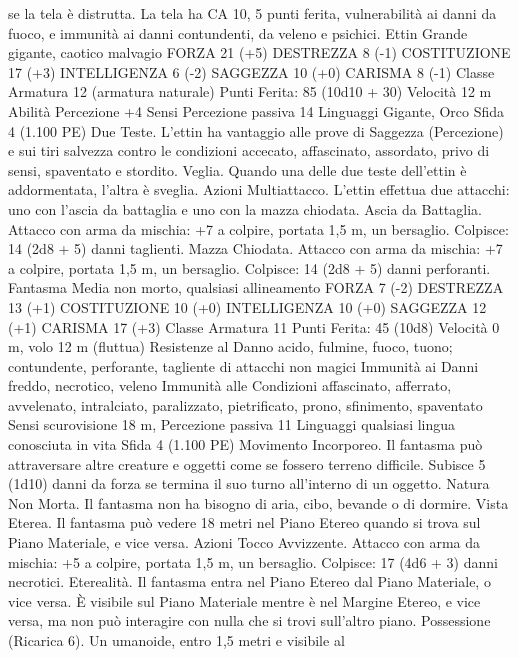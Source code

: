 \begin{multicols}{2}
se la tela è distrutta. La tela ha CA 10, 5 punti ferita,
vulnerabilità ai danni da fuoco, e immunità ai danni contundenti,
da veleno e psichici.
Ettin
Grande gigante, caotico malvagio
FORZA 21 (+5)
DESTREZZA 8 (-1)
COSTITUZIONE 17 (+3)
INTELLIGENZA 6 (-2)
SAGGEZZA 10 (+0)
CARISMA 8 (-1)
Classe Armatura 12 (armatura naturale)
\hspace*{0pt}\hfill{Punti Ferita}: 85 (10d10 + 30)
Velocità 12 m
Abilità Percezione +4
Sensi Percezione passiva 14
Linguaggi Gigante, Orco
Sfida 4 (1.100 PE)
Due Teste. L’ettin ha vantaggio alle prove di Saggezza
(Percezione) e sui tiri salvezza contro le condizioni accecato,
affascinato, assordato, privo di sensi, spaventato e stordito.
Veglia. Quando una delle due teste dell’ettin è addormentata,
l’altra è sveglia.
Azioni
Multiattacco. L’ettin effettua due attacchi: uno con l’ascia da
battaglia e uno con la mazza chiodata.
Ascia da Battaglia. Attacco con arma da mischia: +7 a colpire,
portata 1,5 m, un bersaglio.
Colpisce: 14 (2d8 + 5) danni taglienti.
Mazza Chiodata. Attacco con arma da mischia: +7 a colpire,
portata 1,5 m, un bersaglio.
Colpisce: 14 (2d8 + 5) danni perforanti.
Fantasma
Media non morto, qualsiasi allineamento
FORZA 7 (-2)
DESTREZZA 13 (+1)
COSTITUZIONE 10 (+0)
INTELLIGENZA 10 (+0)
SAGGEZZA 12 (+1)
CARISMA 17 (+3)
Classe Armatura 11
\hspace*{0pt}\hfill{Punti Ferita}: 45 (10d8)
Velocità 0 m, volo 12 m (fluttua)
Resistenze al Danno acido, fulmine, fuoco, tuono; contundente,
perforante, tagliente di attacchi non magici
Immunità ai Danni freddo, necrotico, veleno
Immunità alle Condizioni affascinato, afferrato, avvelenato,
intralciato, paralizzato, pietrificato, prono, sfinimento, spaventato
Sensi scurovisione 18 m, Percezione passiva 11
Linguaggi qualsiasi lingua conosciuta in vita
Sfida 4 (1.100 PE)
Movimento Incorporeo. Il fantasma può attraversare altre creature e
oggetti come se fossero terreno difficile. Subisce 5 (1d10) danni da
forza se termina il suo turno all’interno di un oggetto.
Natura Non Morta. Il fantasma non ha bisogno di aria, cibo,
bevande o di dormire.
Vista Eterea. Il fantasma può vedere 18 metri nel Piano Etereo
quando si trova sul Piano Materiale, e vice versa.
Azioni
Tocco Avvizzente. Attacco con arma da mischia: +5 a colpire,
portata 1,5 m, un bersaglio.
Colpisce: 17 (4d6 + 3) danni necrotici.
Eterealità. Il fantasma entra nel Piano Etereo dal Piano Materiale, o vice
versa. È visibile sul Piano Materiale mentre è nel Margine Etereo, e vice
versa, ma non può interagire con nulla che si trovi sull’altro piano.
Possessione (Ricarica 6). Un umanoide, entro 1,5 metri e visibile al

\end{multicols}
